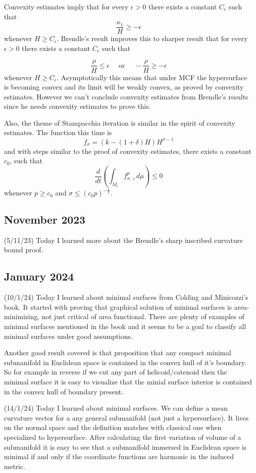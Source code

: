 \documentclass[12pt,a4paper]{article}
\begin{document}
Convexity estimates imply that for every $ \epsilon >0  $ there exists a constant $ C_{\epsilon} $ such that 
\[ \frac{\kappa_{1}}{H} \ge -\epsilon \]
whenever $ H \ge C_{\epsilon} $. Brendle's result improves this to sharper result that for every $ \epsilon >0 $ there exists a constant $ C_{\epsilon} $ such that 

\[ \frac{\rho}{H} \le \epsilon \quad  \text{ or } \quad  - \frac{\rho}{H} \ge - \epsilon  \]
whenever $ H \ge C_{\epsilon} $. Asymptotically this means that under MCF the hypersurface is becoming convex and its limit will be weakly convex, as proved by convexity estimates. However we can't conclude convexity estimates from Brendle's results since he needs convexity estimates to prove this. 

Also, the theme of Stampacchia iteration is similar in the spirit of convexity estimates. The function this time is 
\[ f_{\sigma} = \left(k - (1+ \delta)H\right)H^{\sigma-1} \]
and with steps similar to the proof of convexity estimates, there exists a constant $ c_{0} $, such that 
\[ \frac{d}{dt} \left( \int_{M_{t}}f_{\sigma,+}^{p} d \mu\right) \le 0 \]
whenever $ p \ge c_{0} $ and $ \sigma \le (c_{0}p)^{-\frac{1}{2}} $.

\subsection*{November 2023}
\quad(5/11/23) Today I learned more about the Brendle's sharp inscribed curvature bound proof. 

\subsection*{January 2024}
\quad(10/1/24) Today I learned about minimal surfaces from Colding and Minicozzi's book. It started with proving that graphical solution of minimal surfaces is area-minimizing, not just critical of area functional. There are plenty of examples of minimal surfaces mentioned in the book and it seems to be a goal to classify all minimal surfaces under good assumptions.

Another good result covered is that proposition that any compact minimal submanifold in Euclidean space is contained in the convex hull of it's boundary. So for example in reverse if we cut any part of helicoid/catenoid then the minimal surface it is easy to visualize that the minial surface interior is contained in the convex hull of boundary present.

(14/1/24) Today I learned about minimal surfaces. We can define a mean curvature vector for a any general submanifold (not just a hypersurface). It lives on the normal space and the definition matches with classical one when specialized to hypersurface. After calculating the first variation of volume of a submanifold it is easy to see that a submanifold immersed in Euclidean space is minimal if and only if the coordinate functions are harmonic in the induced metric.
\end{document}
